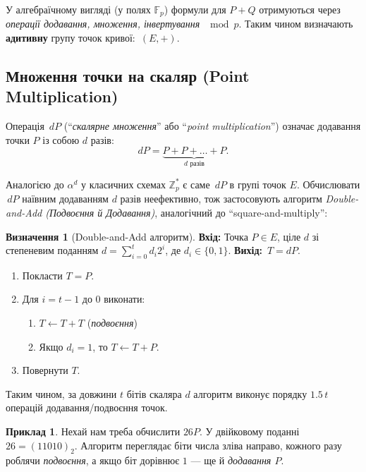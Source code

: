 \documentclass[12pt]{report}
\theoremstyle{definition}
\newtheorem{definition}{Визначення}[chapter]
\newtheorem{example}{Приклад}[chapter]
\theoremstyle{plain}
\begin{document}
У алгебраїчному вигляді (у полях \(\mathbb{F}_p\)) формули для \(P + Q\) 
отримуються через \textit{операції додавання, множення, інвертування} \(\mod p\). 
Таким чином визначають \textbf{адитивну} групу точок кривої: \(\,(E, +)\).

\subsection{Множення точки на скаляр (Point Multiplication)}

Операція \(\,dP\) (``\textit{скалярне множення}'' або ``\textit{point multiplication}'') 
означає додавання точки \(P\) із собою \(d\) разів:
\[
   dP = \underbrace{P + P + \ldots + P}_{d \text{ разів}}.
\]

Аналогією до \(\alpha^d\) у класичних схемах \(\mathbb{Z}_p^*\) є саме \(\,dP\) 
в групі точок \(E\). Обчислювати \(\,dP\) наївним додаванням \(d\) разів неефективно, 
тож застосовують алгоритм \textit{Double-and-Add (Подвоєння й Додавання)}, 
аналогічний до ``square-and-multiply'':

\begin{definition}[Double-and-Add алгоритм]
\textbf{Вхід:} Точка \(P \in E\), ціле \(d\) зі степеневим поданням 
\(d = \sum_{i=0}^{t} d_i 2^i\), де \(d_i \in \{0,1\}\).  
\textbf{Вихід:} \(\,T = dP.\)

\begin{enumerate}
    \item Покласти \(T = P\).
    \item Для \(i = t-1 \text{ до } 0\) виконати:
    \begin{enumerate}
        \item \(T \leftarrow T + T\) \quad (\textit{подвоєння})
        \item Якщо \(d_i = 1\), то \(T \leftarrow T + P\).
    \end{enumerate}
    \item Повернути \(T\).
\end{enumerate}
\end{definition}

Таким чином, за довжини \(t\) бітів скаляра \(d\) алгоритм виконує порядку 
\(1.5\,t\) операцій додавання/подвоєння точок.

\begin{example}
Нехай нам треба обчислити \(26P\). У двійковому поданні \(26 = (11010)_2\). 
Алгоритм переглядає біти числа зліва направо, кожного разу роблячи 
\textit{подвоєння}, а якщо біт дорівнює \(1\) — ще й \textit{додавання \(P\)}.
\end{example}
\end{document}
